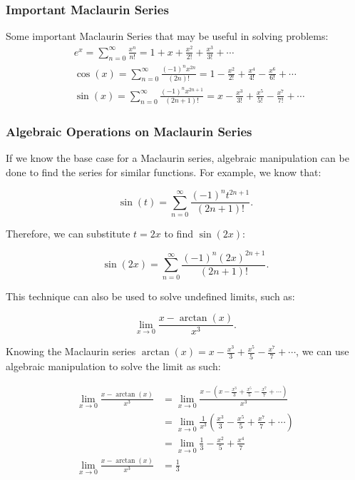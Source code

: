 \documentclass[12pt]{article}
\begin{document}
\subsubsection{Important Maclaurin Series}
\noindent Some important Maclaurin Series that may be useful in solving problems:
\begin{align*}
	& e^x = \sum_{n=0}^\infty \frac{x^n}{n!} = 1 + x + \frac{x^2}{2!} + \frac{x^3}{3!} + \cdots                                   \\[6pt]
	& \cos(x) = \sum_{n=0}^\infty \frac{(-1)^n x^{2n}}{(2n)!} = 1 - \frac{x^2}{2!} + \frac{x^4}{4!} - \frac{x^6}{6!} + \cdots     \\[6pt]
	& \sin(x) = \sum_{n=0}^\infty \frac{(-1)^n x^{2n+1}}{(2n+1)!} = x - \frac{x^3}{3!} + \frac{x^5}{5!} - \frac{x^7}{7!} + \cdots
\end{align*}

\subsubsection{Algebraic Operations on Maclaurin Series}

If we know the base case for a Maclaurin series, algebraic manipulation can be done to find the series for similar functions. For example, we know that:

\[ \sin(t) = \sum_{n=0}^\infty \frac{(-1)^n t^{2n+1}}{(2n+1)!}. \]

\noindent Therefore, we can substitute $t = 2x$ to find $\sin(2x)$:

\[ \sin(2x) = \sum_{n=0}^\infty \frac{(-1)^n (2x)^{2n+1}}{(2n+1)!}. \]

\noindent This technique can also be used to solve undefined limits, such as:

\[ \lim_{x \to 0} \frac{x - \arctan(x)}{x^3}. \]

Knowing the Maclaurin series $\arctan(x) = x - \frac{x^3}{3} + \frac{x^5}{5} - \frac{x^7}{7} + \cdots$, we can use algebraic manipulation to solve the limit as such:

\begin{align*}
	\lim_{x \to 0} \frac{x - \arctan(x)}{x^3} & = \lim_{x \to 0} \frac{x - \left( x - \frac{x^3}{3} + \frac{x^5}{5} - \frac{x^7}{7} + \cdots \right)}{x^3} \\[6pt]
	& = \lim_{x \to 0} \frac{1}{x^3} \left( \frac{x^3}{3} - \frac{x^5}{5} + \frac{x^7}{7} + \cdots \right)       \\[6pt]
	& = \lim_{x \to 0} \frac{1}{3} - \frac{x^2}{5} + \frac{x^4}{7}                                               \\[6pt]
	\lim_{x \to 0} \frac{x - \arctan(x)}{x^3} & = \frac{1}{3}
\end{align*}
\end{document}
